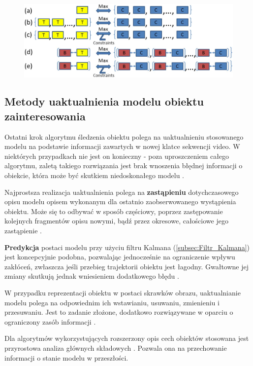 \begin{figure}[!htb]
	\begin{center}
		\includegraphics[width=12cm]{images/target_tracking_methods.png}
	\end{center}	
\label{fig:Metody_sledzenia_obiektow_na_obrazach}
\end{figure}

\subsection{Metody uaktualnienia modelu obiektu zainteresowania}
\label{subsec:Metody_uaktualnienia_modelu_obiektu_zainteresowania}

Ostatni krok algorytmu śledzenia obiektu polega na uaktualnieniu stosowanego modelu na podstawie informacji zawartych w nowej klatce sekwencji video. W niektórych przypadkach nie jest on konieczny - poza uproszczeniem całego algorytmu, zaletą takiego rozwiązania jest brak wnoszenia błędnej informacji o obiekcie, która może być skutkiem niedoskonałego modelu \cite{Smeulders2010}.

Najprostsza realizacja uaktualnienia polega na \textbf{zastąpieniu} dotychczasowego opisu modelu opisem wykonanym dla ostatnio zaobserwowanego wystąpienia obiektu. Może się to odbywać w sposób częściowy, poprzez zastępowanie kolejnych fragmentów opisu nowymi, bądź przez okresowe, całościowe jego zastąpienie \cite{Smeulders2010}. 

\textbf{Predykcja} postaci modelu przy użyciu filtru Kalmana (\ref{subsec:Filtr_Kalmana}) jest koncepcyjnie podobna, pozwalając jednocześnie na ograniczenie wpływu zakłóceń, zwłaszcza jeśli przebieg trajektorii obiektu jest łagodny. Gwałtowne jej zmiany skutkują jednak wniesieniem dodatkowego błędu \cite{Smeulders2010}. 

W przypadku reprezentacji obiektu w postaci skrawków obrazu, uaktualnianie modelu polega na odpowiednim ich wstawianiu, usuwaniu, zmienieniu i przesuwaniu. Jest to zadanie złożone, dodatkowo rozwiązywane w oparciu o ograniczony zasób informacji \cite{Smeulders2010}.

Dla algorytmów wykorzystujących rozszerzony opis cech obiektów stosowana jest przyrostowa analiza głównych składowych \cite{Smeulders2010}. Pozwala ona na przechowanie informacji o stanie modelu w przeszłości.